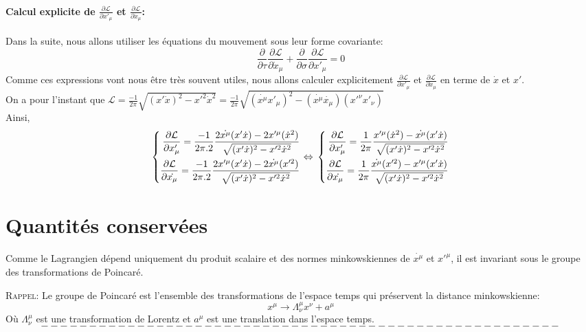 \documentclass[a4paper,12pt]{article}
\def\xmu{x^\mu}
\def\CL{\mathcal{L}}
\begin{document}
\paragraph*{Calcul explicite de $\frac{\partial \CL}{\partial x'_{\mu}}$ et $\frac{\partial \CL}{\partial \dot x_{\mu}}$:}
Dans la suite, nous allons utiliser les équations du mouvement sous leur forme covariante:
$$\frac{\partial}{\partial \tau}\frac{\partial \CL}{\partial \dot x_{\mu}}+\frac{\partial}{\partial \sigma}\frac{\partial \CL}{\partial  x'_{\mu}}=0$$
Comme ces expressions vont nous être très souvent utiles, nous allons calculer explicitement $\frac{\partial \CL}{\partial x'_{\mu}}$ et $\frac{\partial \CL}{\partial \dot x_{\mu}}$ en terme de $\dot{x}$ et $x'$.\\
On a pour l'instant que $\CL=\frac{-1}{2\pi}\sqrt{(x'\dot{x})^2-x'^2\dot{x}^2}=\frac{-1}{2\pi}\sqrt{(\dot{\xmu}x'_\mu)^2-(\dot{\xmu}\dot{x_\mu})(x'^\nu x'_\nu)}$\\
Ainsi,
\begin{equation}
	\left\lbrace 
	\begin{aligned}
	\frac{\partial \CL}{\partial x'_\mu }=\frac{-1}{2\pi.2}\frac{2\dot{\xmu}(x'\dot{x})-2x'^\mu (\dot{x}^2)}{\sqrt{(x'\dot{x})^2-x'^2\dot{x}^2}}\\
	\frac{\partial \CL}{\partial \dot{x_\mu}}=\frac{-1}{2\pi.2}\frac{2x'^\mu(x'\dot{x})-2\dot{\xmu} (x'^2)}{\sqrt{(x'\dot{x})^2-x'^2\dot{x}^2}}\\
	\end{aligned} 
	\right. 
	\Leftrightarrow\\
	\left\lbrace
	\begin{aligned}
	\frac{\partial \CL}{\partial x'_\mu }=\frac{1}{2\pi}\frac{x'^\mu (\dot{x}^2)-\dot{\xmu}(x'\dot{x})}{\sqrt{(x'\dot{x})^2-x'^2\dot{x}^2}}\\
	\frac{\partial \CL}{\partial \dot{x_\mu}}=\frac{1}{2\pi}\frac{\dot{\xmu} (x'^2)-x'^\mu(x'\dot{x})}{\sqrt{(x'\dot{x})^2-x'^2\dot{x}^2}}\\
	\end{aligned}
	\right.\label{mvt}
\end{equation}
\section{Quantités conservées}
Comme le Lagrangien dépend uniquement du produit scalaire et des normes minkowskiennes de $\dot{x^{\mu}}$ et $x'^{\mu}$, il est invariant sous le groupe des transformations de Poincaré.

\textsc{Rappel}: Le groupe de Poincaré est l'ensemble des transformations de l'espace temps qui préservent la distance minkowskienne:
$$ x^{\mu}\rightarrow\Lambda_{\nu}^{\mu}x^{\nu}+a^{\mu}$$ 
Où $\Lambda_{\nu}^{\mu}$ est une transformation de Lorentz et $a^{\mu}$ est une translation dans l'espace temps.\\
$$------------------------------------------------------$$
\end{document}
